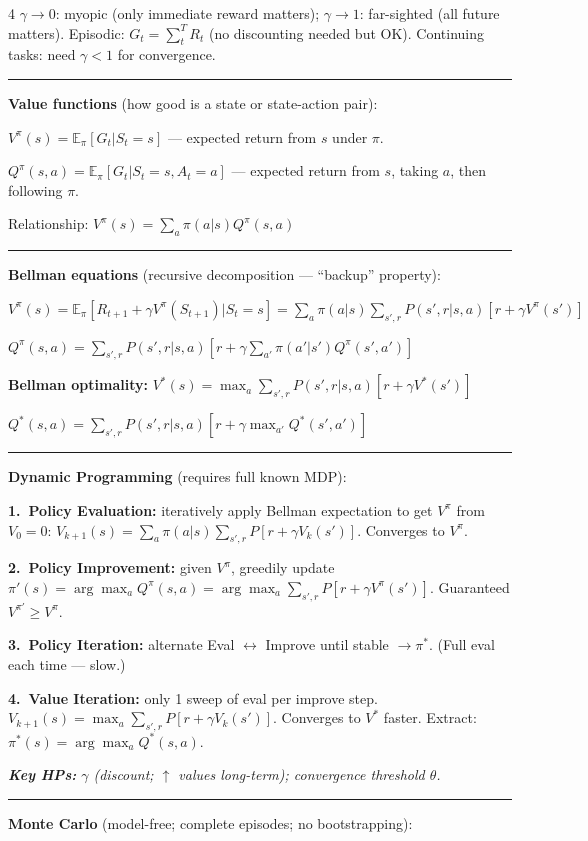 \documentclass[6.5pt,landscape]{article}
\newcommand{\rl}{\vspace{-1.5pt}\par\noindent\rule{\columnwidth}{0.15pt}\par\vspace{-1pt}}
\newcommand{\hp}[1]{\textit{\textbf{Key HPs:} #1}}
\newcommand{\E}{\mathbb{E}}
\begin{document}
\begin{multicols*}{4}
$\gamma\to0$: myopic (only immediate reward matters); $\gamma\to1$: far-sighted (all future matters). Episodic: $G_t=\sum_{t}^T R_t$ (no discounting needed but OK). Continuing tasks: need $\gamma<1$ for convergence.\par
\rl
\noindent\textbf{Value functions} (how good is a state or state-action pair):\par
$V^\pi(s)=\E_\pi[G_t|S_t=s]$ --- expected return from $s$ under $\pi$.\par
$Q^\pi(s,a)=\E_\pi[G_t|S_t=s,A_t=a]$ --- expected return from $s$, taking $a$, then following $\pi$.\par
Relationship: $V^\pi(s)=\sum_a\pi(a|s)Q^\pi(s,a)$\par
\rl
\noindent\textbf{Bellman equations} (recursive decomposition --- ``backup'' property):\par
$V^\pi(s)=\E_\pi[R_{t+1}+\gamma V^\pi(S_{t+1})|S_t=s]=\sum_a\pi(a|s)\sum_{s',r}P(s',r|s,a)[r+\gamma V^\pi(s')]$\par
$Q^\pi(s,a)=\sum_{s',r}P(s',r|s,a)\left[r+\gamma\sum_{a'}\pi(a'|s')Q^\pi(s',a')\right]$\par
\textbf{Bellman optimality:} $V^*(s)=\max_a\sum_{s',r}P(s',r|s,a)[r+\gamma V^*(s')]$\par
$Q^*(s,a)=\sum_{s',r}P(s',r|s,a)[r+\gamma\max_{a'}Q^*(s',a')]$\par
\rl
\noindent\textbf{Dynamic Programming} (requires full known MDP):\par
\textbf{1.\ Policy Evaluation:} iteratively apply Bellman expectation to get $V^\pi$ from $V_0=0$: $V_{k+1}(s)=\sum_a\pi(a|s)\sum_{s',r}P[r+\gamma V_k(s')]$. Converges to $V^\pi$.\par
\textbf{2.\ Policy Improvement:} given $V^\pi$, greedily update $\pi'(s)=\arg\max_a Q^\pi(s,a)=\arg\max_a\sum_{s',r}P[r+\gamma V^\pi(s')]$. Guaranteed $V^{\pi'}\geq V^\pi$.\par
\textbf{3.\ Policy Iteration:} alternate Eval $\leftrightarrow$ Improve until stable $\to\pi^*$. (Full eval each time --- slow.)\par
\textbf{4.\ Value Iteration:} only 1 sweep of eval per improve step. $V_{k+1}(s)=\max_a\sum_{s',r}P[r+\gamma V_k(s')]$. Converges to $V^*$ faster. Extract: $\pi^*(s)=\arg\max_a Q^*(s,a)$.\par
\hp{$\gamma$ (discount; $\uparrow$ values long-term); convergence threshold $\theta$.}\par
\rl
\noindent\textbf{Monte Carlo} (model-free; complete episodes; no bootstrapping):\par

\end{multicols*}
\end{document}
